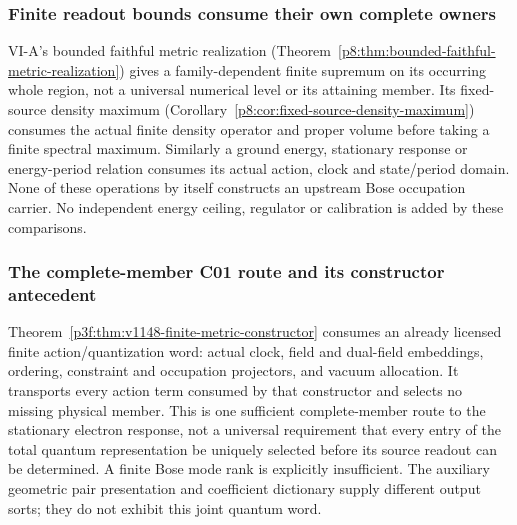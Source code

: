 \documentclass[11pt,a4paper]{article}
\begin{document}
\subsubsection{Finite readout bounds consume their own complete owners}
VI-A's bounded faithful metric realization
(Theorem~\ref{p8:thm:bounded-faithful-metric-realization}) gives a
family-dependent finite supremum on its occurring whole region, not a
universal numerical level or its attaining member. Its fixed-source density
maximum (Corollary~\ref{p8:cor:fixed-source-density-maximum}) consumes the
actual finite density operator and proper volume before taking a finite
spectral maximum. Similarly a ground energy, stationary response or
energy-period relation consumes its actual action, clock and state/period
domain. None of these operations by itself constructs an upstream Bose
occupation carrier. No independent energy ceiling, regulator or calibration
is added by these comparisons.

\subsubsection{The complete-member C01 route and its constructor antecedent}
Theorem~\ref{p3f:thm:v1148-finite-metric-constructor} consumes an already
licensed finite action/quantization word: actual clock, field and dual-field
embeddings, ordering, constraint and occupation projectors, and vacuum
allocation. It transports every action term consumed by that constructor and selects no
missing physical member.  This is one sufficient complete-member route to
the stationary electron response, not a universal requirement that every
entry of the total quantum representation be uniquely selected before its
source readout can be determined. A finite Bose mode rank is explicitly insufficient. The auxiliary
geometric pair presentation and coefficient dictionary supply different
output sorts; they do not exhibit this joint quantum word.
\end{document}
